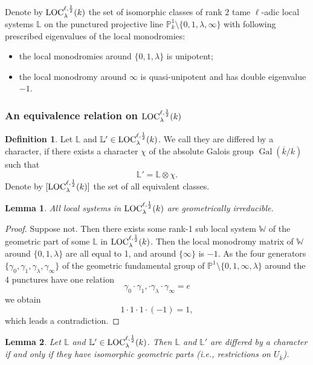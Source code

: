 \documentclass[12pt,twoside]{book}
\theoremstyle{plain}
\newtheorem{lemma}[lemma]{Lemma}
\theoremstyle{definition}
\newtheorem{definition}[definition]{Definition}
\theoremstyle{remark}
\newcommand{\bL}{{\mathbb L}}
\newcommand{\bP}{{\mathbb P}}
\newcommand{\bW}{{\mathbb W}}
\DeclareMathOperator\Gal{Gal}
\numberwithin{equation}{section}
\def\Loch{{\mathrm{LOC}^{\ell,{1\over 2}}_{\lambda}}}
\begin{document}
Denote by $\Loch(k)$ the set of isomorphic classes of rank $2$ tame $\ell$-adic local systems $\bL$ on the punctured projective line $\bP^1_{k} \setminus \{0,1,\lambda,\infty\}$ with following prescribed eigenvalues of the local monodromies:
\begin{itemize}
\item the local monodromies around $\{0,1,\lambda\}$ is unipotent;
\item the local monodromy around $\infty$ is quasi-unipotent and has double eigenvalue $-1$.
\end{itemize}

\subsubsection{An equivalence relation on $\Loch(k)$}

\begin{definition} Let $\bL$ and $\bL' \in \Loch(k)$. We call they are differed by a character, if there exists a character $\chi$ of the absolute Galois group $\Gal(\overline{k}/k)$ such that
\[\bL' = \bL \otimes \chi.\]
Denote by $[\Loch(k)]$ the set of all equivalent classes.
\end{definition}

\begin{lemma} All local systems in $\Loch(k)$ are geometrically irreducible.
\end{lemma}
\begin{proof} Suppose not. Then there exists some rank-1 sub local system $\bW$ of the geometric part of some $\bL$ in $\Loch(k)$. Then the local monodromy matrix of $\bW$ around $\{0,1,\lambda\}$ are all equal to 1, and around $\{\infty \}$ is $-1$. As the four generators $\{\gamma_0,\gamma_1,\gamma_\lambda,\gamma_\infty \}$ of the geometric fundamental group of $\bP^1 \setminus \{0,1,\infty,\lambda \}$ around the 4 punctures have one relation
\[\gamma_0 \cdot \gamma_1,\cdot \gamma_\lambda\cdot \gamma_\infty=e\]
we obtain\[1 \cdot 1 \cdot 1 \cdot (-1)=1,\]
which leads a contradiction.
\end{proof}

\begin{lemma} Let $\bL$ and $\bL' \in \Loch(k)$. Then $\bL$ and $\bL'$ are differed by a character if and only if they have isomorphic geometric parts (i.e., restrictions on $U_{\overline{k}}$).
\end{lemma}
\end{document}
